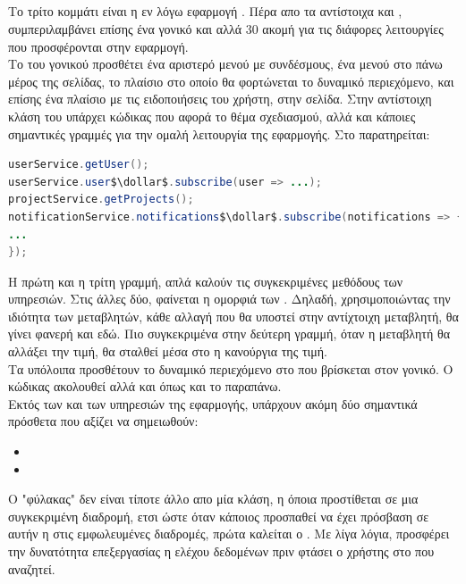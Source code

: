 \subsection*{}
\pSpace Το τρίτο κομμάτι είναι η εν λόγω εφαρμογή . Πέρα απο τα αντίστοιχα  και , συμπεριλαμβάνει επίσης ένα γονικό  και αλλά 30 ακομή για τις διάφορες λειτουργίες που προσφέρονται στην εφαρμογή.\\
\pSpace Το  του γονικού  προσθέτει ένα αριστερό μενού με συνδέσμους, ένα μενού στο πάνω μέρος της σελίδας, το πλαίσιο στο οποίο θα φορτώνεται το δυναμικό περιεχόμενο, και επίσης ένα πλαίσιο με τις ειδοποιήσεις του χρήστη, στην σελίδα. Στην αντίστοιχη κλάση του  υπάρχει κώδικας που αφορά το θέμα σχεδιασμού, αλλά και κάποιες σημαντικές γραμμές για την ομαλή λειτουργία της εφαρμογής. Στο  παρατηρείται:\\
	\begin{lstlisting}[language=Java]
userService.getUser();
userService.user$\dollar$.subscribe(user => ...);
projectService.getProjects();
notificationService.notifications$\dollar$.subscribe(notifications => {
...
});
	\end{lstlisting}
\pSpace Η πρώτη και η τρίτη γραμμή, απλά καλούν τις συγκεκριμένες μεθόδους των υπηρεσιών. Στις άλλες δύο, φαίνεται η ομορφιά των . Δηλαδή, χρησιμοποιώντας την ιδιότητα  των  μεταβλητών, κάθε αλλαγή που θα υποστεί στην αντίχτοιχη μεταβλητή, θα γίνει φανερή και εδώ. Πιο συγκεκριμένα στην δεύτερη γραμμή, όταν η μεταβλητή  θα αλλάξει την τιμή, θα σταλθεί μέσα στο  η κανούργια της τιμή.\\
\pSpace Τα υπόλοιπα  προσθέτουν το δυναμικό περιεχόμενο στο  που βρίσκεται στον γονικό. Ο κώδικας ακολουθεί  αλλά και  όπως και το παραπάνω.\\
\pSpace Εκτός των  και των υπηρεσιών της εφαρμογής, υπάρχουν ακόμη δύο σημαντικά πρόσθετα που αξίζει να σημειωθούν:
\begin{itemize}
	\item {}
	\item {}
\end{itemize}
\pSpace Ο "φύλακας" δεν είναι τίποτε άλλο απο μία κλάση, η όποια προστίθεται σε μια συγκεκριμένη διαδρομή, ετσι ώστε όταν κάποιος προσπαθεί να έχει πρόσβαση σε αυτήν η στις εμφωλευμένες διαδρομές, πρώτα καλείται ο . Με λίγα λόγια, προσφέρει την δυνατότητα επεξεργασίας η ελέχου δεδομένων πριν φτάσει ο χρήστης στο  που αναζητεί.\\
